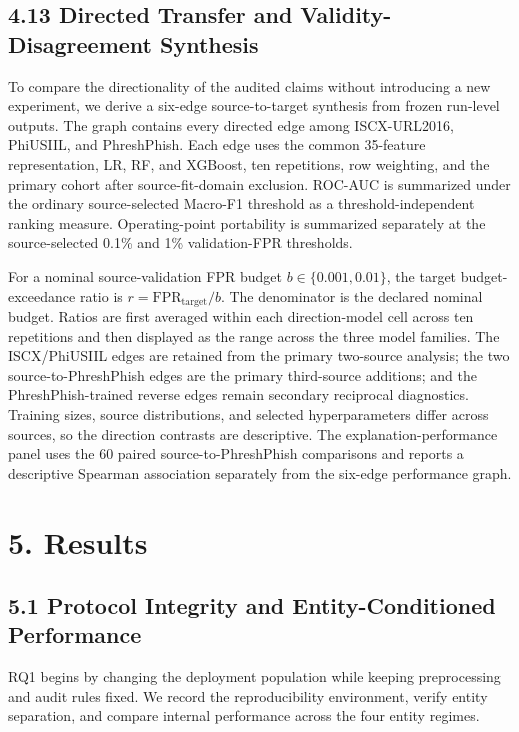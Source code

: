 \documentclass[
  10pt,
]{article}
\begin{document}
\subsection{4.13 Directed Transfer and Validity-Disagreement
Synthesis}\label{directed-transfer-and-validity-disagreement-synthesis}

To compare the directionality of the audited claims without introducing
a new experiment, we derive a six-edge source-to-target synthesis from
frozen run-level outputs. The graph contains every directed edge among
ISCX-URL2016, PhiUSIIL, and PhreshPhish. Each edge uses the common
35-feature representation, LR, RF, and XGBoost, ten repetitions, row
weighting, and the primary cohort after source-fit-domain exclusion.
ROC-AUC is summarized under the ordinary source-selected Macro-F1
threshold as a threshold-independent ranking measure. Operating-point
portability is summarized separately at the source-selected 0.1\% and
1\% validation-FPR thresholds.

For a nominal source-validation FPR budget \(b\in\{0.001,0.01\}\), the
target budget-exceedance ratio is
\(r=\mathrm{FPR}_{\mathrm{target}}/b\). The denominator is the declared
nominal budget. Ratios are first averaged within each direction-model
cell across ten repetitions and then displayed as the range across the
three model families. The ISCX/PhiUSIIL edges are retained from the
primary two-source analysis; the two source-to-PhreshPhish edges are the
primary third-source additions; and the PhreshPhish-trained reverse
edges remain secondary reciprocal diagnostics. Training sizes, source
distributions, and selected hyperparameters differ across sources, so
the direction contrasts are descriptive. The explanation-performance
panel uses the 60 paired source-to-PhreshPhish comparisons and reports a
descriptive Spearman association separately from the six-edge
performance graph.

\section{5. Results}\label{results}

\subsection{5.1 Protocol Integrity and Entity-Conditioned
Performance}\label{protocol-integrity-and-entity-conditioned-performance}

RQ1 begins by changing the deployment population while keeping
preprocessing and audit rules fixed. We record the reproducibility
environment, verify entity separation, and compare internal performance
across the four entity regimes.
\end{document}
